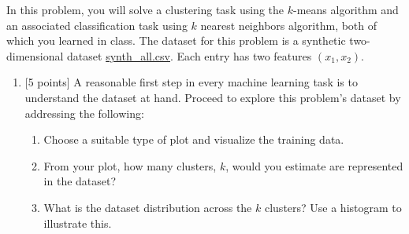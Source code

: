 \documentclass[12pt]{article}
\newenvironment{problem}[2][Problem:]{\begin{trivlist}
\item[\hskip \labelsep {\bfseries #1}\hskip \labelsep {\bfseries #2.}]}{\end{trivlist}}
\begin{document}
\begin{problem}{$K$-Means Clustering [15 points]}
In this problem, you will solve a clustering task using the $k$-means algorithm and an associated classification task using $k$ nearest neighbors algorithm, both of which you learned in class. 
The dataset for this problem is a synthetic two-dimensional dataset \href{https://canvas.dartmouth.edu/files/3128646/download?download_frd=1}{{synth\_all.csv}}.
Each entry has two features $(x_1,x_2)$. 

\begin{enumerate}
    \item {[5 points]} A reasonable first step in every machine learning task is to understand the dataset at hand. Proceed to explore this problem's dataset by addressing the following:
    \begin{enumerate}
            \item Choose a suitable type of plot and visualize the training data.
            \item From your plot, how many clusters, $k$, would you estimate are represented in the dataset? \label{pt:clusters}
            \item What is the dataset distribution across the $k$ clusters? Use a histogram to illustrate this.
    \end{enumerate}


\end{enumerate}
\end{problem}
\end{document}
